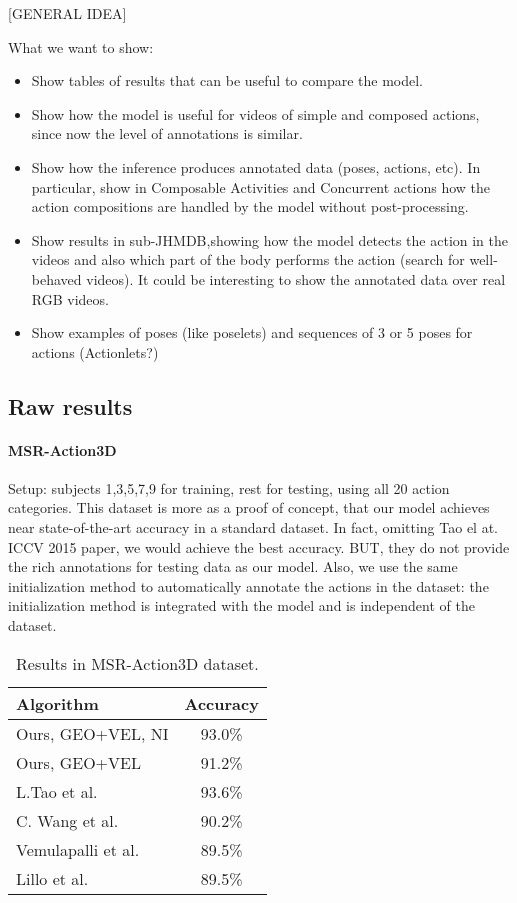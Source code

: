 [GENERAL IDEA]

What we want to show:
\begin{itemize}
\item Show tables of results that can be useful to compare the model.
\item Show how the model is useful for videos of simple and composed actions, since now the level of annotations is similar.
\item Show how the inference produces annotated data (poses, actions, etc). In particular, show in Composable Activities and Concurrent actions how the action compositions are handled by the model without post-processing.
\item Show results in sub-JHMDB,showing how the model detects the action in the videos and also which part of the body performs the action (search for well-behaved videos). It could be interesting to show the annotated data over real RGB videos. 
\item Show examples of poses (like poselets) and sequences of 3 or 5 poses for actions (Actionlets?)
\end{itemize}

\subsection{Raw results}
\label{subsec:exp_setup}

\paragraph{MSR-Action3D} Setup: subjects 1,3,5,7,9 for training, rest for testing, using all 20 action categories. This dataset is more as a proof of concept, that our model achieves near state-of-the-art accuracy in a standard dataset. In fact, omitting Tao el at. ICCV 2015 paper, we would achieve the best accuracy. BUT, they do not provide the rich annotations for testing data as our model. Also, we use the same initialization method to automatically annotate the actions in the dataset: the initialization method is integrated with the model and is independent of the dataset.

\begin{table}
\centering
\begin{tabular}{|l|c|}
\hline
\textbf{Algorithm} & \textbf{Accuracy}\\
\hline
Ours, GEO+VEL, NI &  93.0\% \\
Ours, GEO+VEL  & 91.2\% \\
\hline
L.Tao et al. \cite{Tao2015} & 93.6\% \\
C. Wang et al.\cite{Wang2013} &    90.2\% \\
Vemulapalli et al. \cite{vemulapalli2014human} & 89.5\% \\
Lillo et al. \cite{Lillo2014} & 89.5\%\\
\hline
\end{tabular}
\caption{Results in MSR-Action3D dataset. }
\end{table}

